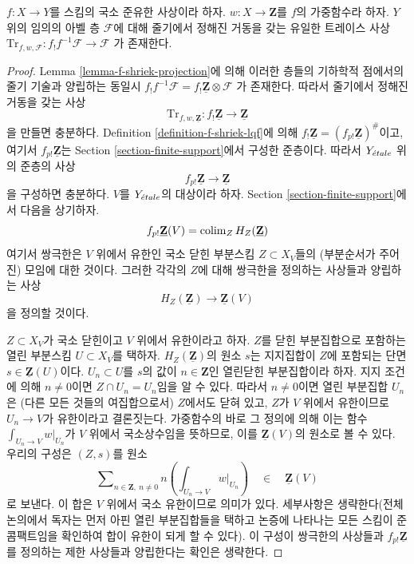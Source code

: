 \begin{lemma}
\label{lemma-trace-map-exists}
$f : X \to Y$를 스킴의 국소 준유한 사상이라 하자.
$w : X \to \mathbf{Z}$를 $f$의 가중함수라 하자. $Y$ 위의 임의의
아벨 층 $\mathcal{F}$에 대해 줄기에서 정해진 거동을 갖는 유일한
트레이스 사상
$\text{Tr}_{f, w, \mathcal{F}} : f_!f^{-1}\mathcal{F} \to \mathcal{F}$
가 존재한다.
\end{lemma}

\begin{proof}
Lemma \ref{lemma-f-shriek-projection}에 의해 이러한 층들의 기하학적
점에서의 줄기 기술과 양립하는 동일시
$f_!f^{-1}\mathcal{F} = f_!\underline{\mathbf{Z}} \otimes \mathcal{F}$
가 존재한다. 따라서 줄기에서 정해진 거동을 갖는 사상
$$
\text{Tr}_{f, w, \underline{\mathbf{Z}}} :
f_!\underline{\mathbf{Z}}
\longrightarrow
\underline{\mathbf{Z}}
$$
을 만들면 충분하다. Definition \ref{definition-f-shriek-lqf}에 의해
$f_!\underline{\mathbf{Z}} = (f_{p!}\underline{\mathbf{Z}})^\#$이고,
여기서 $f_{p!}\underline{\mathbf{Z}}$는 Section
\ref{section-finite-support}에서 구성한 준층이다. 따라서
$Y_{\acute{e}tale}$ 위의 준층의 사상
$$
f_{p!}\underline{\mathbf{Z}} \longrightarrow \underline{\mathbf{Z}}
$$
을 구성하면 충분하다. $V$를 $Y_{\acute{e}tale}$의 대상이라 하자.
Section \ref{section-finite-support}에서 다음을 상기하자.
$$
f_{p!}\underline{\mathbf{Z}}(V) = \mathop{\mathrm{colim}}\nolimits_Z H_Z(\underline{\mathbf{Z}})
$$
여기서 쌍극한은 $V$ 위에서 유한인 국소 닫힌 부분스킴
$Z \subset X_V$들의 (부분순서가 주어진) 모임에 대한 것이다.
그러한 각각의 $Z$에 대해 쌍극한을 정의하는 사상들과 양립하는 사상
$$
H_Z(\underline{\mathbf{Z}}) \longrightarrow \underline{\mathbf{Z}}(V)
$$
을 정의할 것이다.

\medskip\noindent
$Z \subset X_V$가 국소 닫힌이고 $V$ 위에서 유한이라고 하자.
$Z$를 닫힌 부분집합으로 포함하는 열린 부분스킴 $U \subset X_V$를
택하자. $H_Z(\underline{\mathbf{Z}})$의 원소 $s$는 지지집합이 $Z$에
포함되는 단면 $s \in \underline{\mathbf{Z}}(U)$이다.
$U_n \subset U$를 $s$의 값이 $n \in \mathbf{Z}$인 열린닫힌
부분집합이라 하자. 지지 조건에 의해 $n \not = 0$이면
$Z \cap U_n = U_n$임을 알 수 있다. 따라서 $n \not = 0$이면 열린
부분집합 $U_n$은 (다른 모든 것들의 여집합으로서) $Z$에서도 닫혀 있고,
$Z$가 $V$ 위에서 유한이므로 $U_n \to V$가 유한이라고 결론짓는다.
가중함수의 바로 그 정의에 의해 이는 함수
$\int_{U_n \to V} w|_{U_n}$가 $V$ 위에서 국소상수임을 뜻하므로,
이를 $\underline{\mathbf{Z}}(V)$의 원소로 볼 수 있다. 우리의 구성은
$(Z, s)$를 원소
$$
\sum\nolimits_{n \in \mathbf{Z},\ n \not = 0}
n \left(\int_{U_n \to V} w|_{U_n}\right)
\quad \in \quad \underline{\mathbf{Z}}(V)
$$
로 보낸다. 이 합은 $V$ 위에서 국소 유한이므로 의미가 있다.
세부사항은 생략한다(전체 논의에서 독자는 먼저 아핀 열린 부분집합들을
택하고 논증에 나타나는 모든 스킴이 준콤팩트임을 확인하여 합이 유한이
되게 할 수 있다). 이 구성이 쌍극한의 사상들과
$f_{p!}\underline{\mathbf{Z}}$를 정의하는 제한 사상들과 양립한다는
확인은 생략한다.


\end{proof}
